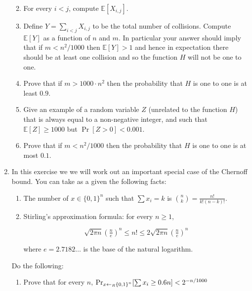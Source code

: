 \begin{enumerate}
  \begin{enumerate}
  \def\labelenumii{\arabic{enumii}.}
  \item
    For every \(i<j\), compute \({\mathbb{E}}[ X_{i,j} ]\).
  \item
    Define \(Y = \sum_{i<j} X_{i,j}\) to be the total number of
    collisions. Compute \({\mathbb{E}}[ Y ]\) as a function of \(n\) and
    \(m\). In particular your answer should imply that if
    \(m < n^2/1000\) then \({\mathbb{E}}[Y]>1\) and hence in expectation
    there should be at least one collision and so the function \(H\)
    will not be one to one.
  \item
    Prove that if \(m > 1000\cdot n^2\) then the probability that \(H\)
    is one to one is at least \(0.9\).
  \item
    Give an example of a random variable \(Z\) (unrelated to the
    function \(H\)) that is always equal to a non-negative integer, and
    such that \({\mathbb{E}}[Z] \geq 1000\) but \(\Pr[ Z > 0] < 0.001\).
  \item
    Prove that if \(m < n^2/1000\) then the probability that \(H\) is
    one to one is at most \(0.1\).
  \end{enumerate}
\item
  In this exercise we we will work out an important special case of the
  Chernoff bound. You can take as a given the following facts:

  \begin{enumerate}
  \def\labelenumii{\arabic{enumii}.}
  \item
    The number of \(x\in{\{0,1\}}^n\) such that \(\sum x_i = k\) is
    \(\binom{n}{k} = \tfrac{n!}{k!(n-k)!}\).
  \item
    Stirling's approximation formula: for every \(n\geq 1\),

    \[
    \sqrt{2\pi n}\left(\tfrac{n}{e}\right)^n \leq n! \leq 2\sqrt{2\pi n}\left(\tfrac{n}{e}\right)^n
    \]

    where \(e=2.7182\ldots\) is the base of the natural logarithm.
  \end{enumerate}

  Do the following:

  \begin{enumerate}
  \def\labelenumii{\arabic{enumii}.}
  \tightlist
  \item
    Prove that for every \(n\),
    \(\Pr_{x{\leftarrow_{\tiny R}}{\{0,1\}}^n} [ \sum x_i \geq 0.6n ] < 2^{-n/1000}\)
  \end{enumerate}


\end{enumerate}
